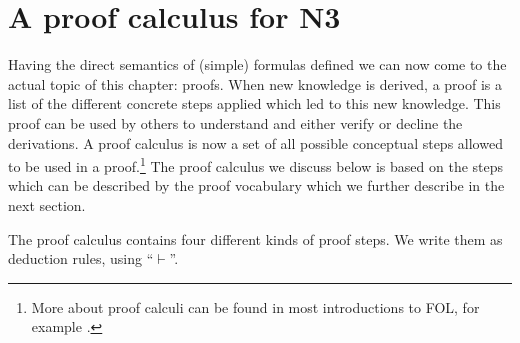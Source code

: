 


\section{A proof calculus for N3}\label{cal}
\label{sec:ProofAnatomy}
Having the direct semantics of (simple) \nthree formulas defined we can now come to the actual topic of this chapter: proofs. When new knowledge is derived,
a proof is a list of the different concrete steps 
 applied which led to this new knowledge. This proof can be used by others to understand and either verify or decline the derivations. A proof calculus is now a set of all 
possible conceptual steps allowed to be used in a proof.\footnote{More about proof calculi can be found in most introductions to FOL, for example \cite{ebbinghaus,enderton,mendelson}.}
The proof calculus we discuss below is based on the steps which can be described by the \nthree proof vocabulary which we further describe in the next section.
% 
% 

The \nthree proof calculus contains four different kinds of proof steps. We write them as deduction rules, using ``$\vdash$''.

